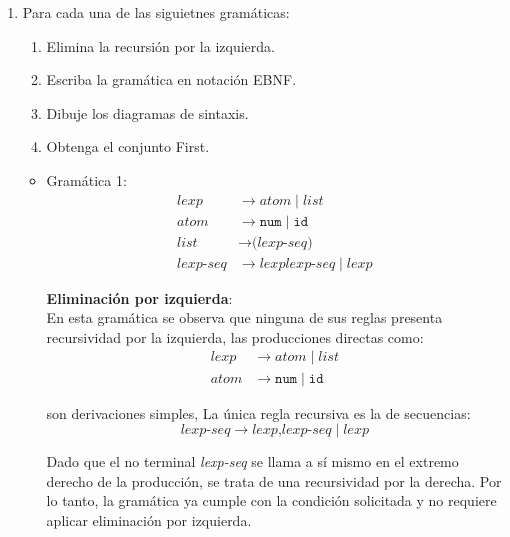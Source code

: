 \documentclass[12pt,letterpaper]{article}
\newcommand{\nt}[1]{\textit{#1}}
\newcommand{\tk}[1]{\texttt{#1}}
\begin{document}
\thispagestyle{empty}


\newpage

\begin{enumerate}[label=\arabic*.]

\item Para cada una de las siguietnes gramáticas:

  \begin{enumerate}[label=\alph*.]
  \item Elimina la recursión por la izquierda.

  \item Escriba la gramática en notación EBNF.

  \item Dibuje los diagramas de sintaxis.

  \item Obtenga el conjunto First.
    
  \end{enumerate}

  \begin{itemize}
  \item Gramática 1:
    \[
    \begin{aligned}
      \nt{lexp} &\to \nt{atom} \mid \nt{list}\\
      \nt{atom} &\to \tk{num} \mid \tk{id}\\
      \nt{list} &\to \tk{(}\nt{lexp-seq}\tk{)}\\
      \nt{lexp-seq} &\to \nt{lexp} \nt{lexp-seq} \mid \nt{lexp}
    \end{aligned}
    \]

    \textbf{\large Eliminación por izquierda}:\\
    En esta gramática se observa que ninguna de sus reglas presenta recursividad por la izquierda, las
    producciones directas como:
    \[
    \begin{aligned}
      \nt{lexp} &\rightarrow \nt{atom} \mid \nt{list}\\
      \nt{atom} &\rightarrow \tk{num} \mid \tk{id}
    \end{aligned}
    \]
    
    son  derivaciones simples, La única regla recursiva es la de secuencias:
    \[
    \nt{lexp-seq} \rightarrow \nt{lexp}\tk{,} \nt{lexp-seq} \mid \nt{lexp}
    \]
    
    Dado que el no terminal \nt{lexp-seq} se llama a sí mismo en el extremo derecho de la producción, se trata
    de una recursividad por la derecha. Por lo tanto, la gramática ya cumple con la condición solicitada y no
    requiere aplicar eliminación por izquierda.\\


\end{itemize}
\end{enumerate}
\end{document}
